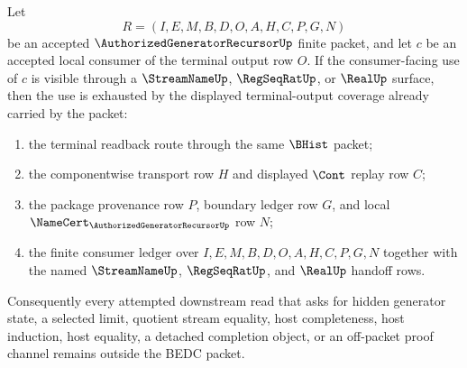 \begin{lemma}
\label{lem:authorized-generator-recursor-terminal-output-downstream-coverage}
Let
$$
R=(I,E,M,B,D,O,A,H,C,P,G,N)
$$
be an accepted $\AuthorizedGeneratorRecursorUp$ finite packet, and let $c$ be an accepted local consumer of the terminal output row $O$. If the consumer-facing use of $c$ is visible through a $\StreamNameUp$, $\RegSeqRatUp$, or $\RealUp$ surface, then the use is exhausted by the displayed terminal-output coverage already carried by the packet:
\begin{enumerate}
\item the terminal readback route through the same $\BHist$ packet;
\item the componentwise transport row $H$ and displayed $\Cont$ replay row $C$;
\item the package provenance row $P$, boundary ledger row $G$, and local $\NameCert_{\AuthorizedGeneratorRecursorUp}$ row $N$;
\item the finite consumer ledger over $I,E,M,B,D,O,A,H,C,P,G,N$ together with the named $\StreamNameUp$, $\RegSeqRatUp$, and $\RealUp$ handoff rows.
\end{enumerate}
Consequently every attempted downstream read that asks for hidden generator state, a selected limit, quotient stream equality, host completeness, host induction, host equality, a detached completion object, or an off-packet proof channel remains outside the BEDC packet.
\end{lemma}
